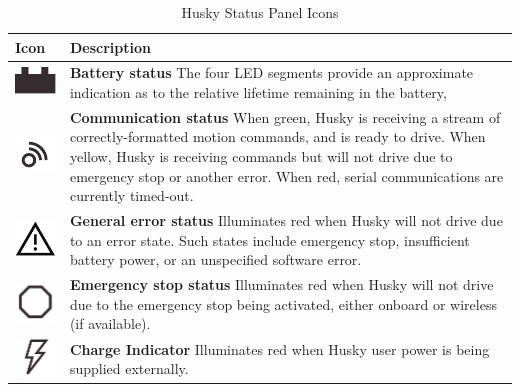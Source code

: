 \documentclass[]{clearpath-latex/clearpath-manual}
\begin{document}
\begin{table}[h]
  \renewcommand{\arraystretch}{1.6}
  \centering
    \begin{tabular}{ >{\centering\arraybackslash}m{.1\linewidth} >{\raggedright\arraybackslash}m{.7\linewidth} }
      \hline
    \rowcolor{lightgrey} Icon & Description
      \\ \hline
    \includegraphics[width=0.7 cm]{battery-mini.png} &
      \textbf{Battery status} The four LED segments provide an approximate indication as to the relative lifetime remaining in the battery,
      \\[4pt] \hline
    \includegraphics[width=0.7 cm]{comm-mini.png} &
      \textbf{Communication status} When green, Husky is receiving a stream of correctly-formatted motion commands, and is ready to drive. When yellow, Husky is receiving commands but will not drive due to emergency stop or another error. When red, serial communications are currently timed-out.
      \\[4pt] \hline
    \includegraphics[width=0.7 cm]{err-mini.png} &
      \textbf{General error status} Illuminates red when Husky will not drive due to an error state. Such states include emergency stop, insufficient battery power, or an unspecified software error.
      \\[4pt] \hline
    \includegraphics[width=0.7 cm]{estop-mini.png} &
      \textbf{Emergency stop status} Illuminates red when Husky will not drive due to the emergency stop being activated, either onboard or wireless (if available).
      \\[4pt] \hline
    \includegraphics[width=0.7 cm]{charge-mini.png} &
      \textbf{Charge Indicator} Illuminates red when Husky user power is being supplied externally.
      \\[4pt] \hline
    \end{tabular}
  \caption{Husky Status Panel Icons}
  \label{status_panel}
\end{table}
\newpage
\end{document}
